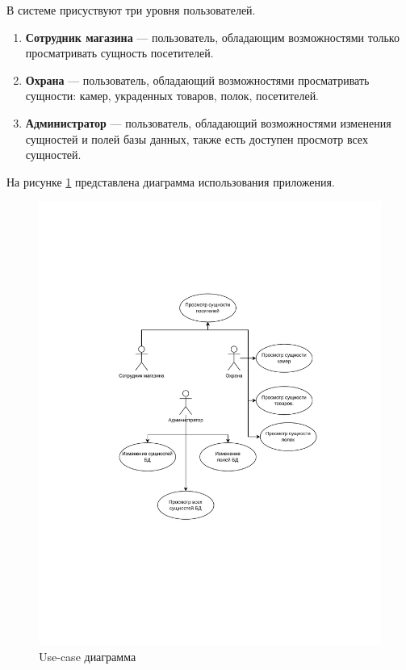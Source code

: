 В системе присуствуют три уровня пользователей.

\begin{enumerate}[label=\arabic*.]
    \item \textbf{Сотрудник магазина} --- пользователь, обладающим возможностями только просматривать
    сущность посетителей.
	\item \textbf{Охрана} --- пользователь, обладающий возможностями просматривать сущности: камер,
	украденных товаров, полок, посетителей.
	\item \textbf{Администратор} --- пользователь, обладающий возможностями изменения сущностей и полей
	базы данных, также есть доступен просмотр всех сущностей.
\end{enumerate}

На рисунке \ref{fig:anal:use-case} представлена диаграмма использования приложения.

\begin{figure}[ht!]
	\centering
	\includegraphics[width=1\linewidth]{assets/images/Use-case.drawio.pdf}
	\caption{Use-case диаграмма}
	\label{fig:anal:use-case}
\end{figure}
\FloatBarrier

